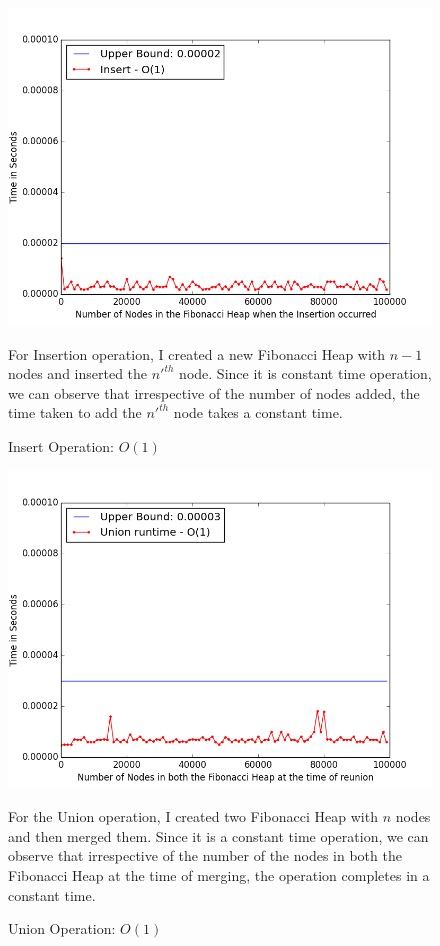 \begin{figure}
\includegraphics[width=0.95\columnwidth]{Figures/fibonacciHeapPerformanceInsert}
\caption{Insert Operation: $O(1)$}
\label{performanceInsert}
For Insertion operation, I created a new Fibonacci Heap with $n-1$ nodes and inserted the $n'^{th}$ node. Since it is constant time operation, we can observe that irrespective of the number of nodes added, the time taken to add the $n'^{th}$ node takes a constant time.
\end{figure}
\begin{figure}
\includegraphics[width=0.95\columnwidth]{Figures/fibonacciHeapPerformanceUnion}
\caption{Union Operation: $O(1)$}
\label{performanceUnion}
For the Union operation, I created two Fibonacci Heap with $n$ nodes and then merged them. Since it is a constant time operation, we can observe that irrespective of the number of the nodes in both the Fibonacci Heap at the time of merging, the operation completes in a constant time.
\end{figure}
